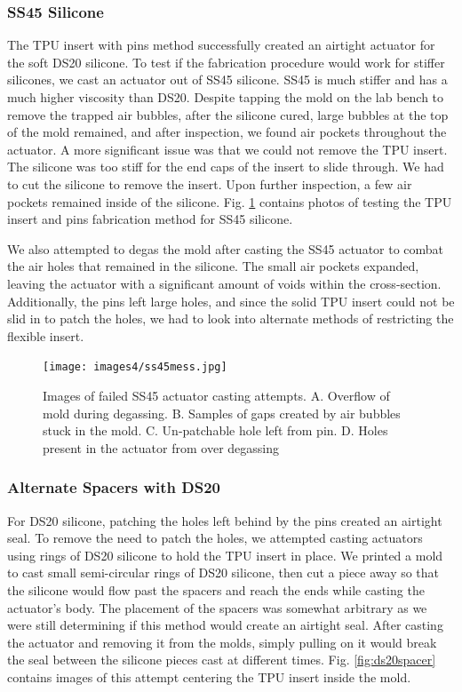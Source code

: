 \subsubsection{SS45 Silicone}

The TPU insert with pins method successfully created an airtight actuator for the soft DS20 silicone. To test if the fabrication procedure would work for stiffer silicones, we cast an actuator out of SS45 silicone. SS45 is much stiffer and has a much higher viscosity than DS20. Despite tapping the mold on the lab bench to remove the trapped air bubbles, after the silicone cured, large bubbles at the top of the mold remained, and after inspection, we found air pockets throughout the actuator. A more significant issue was that we could not remove the TPU insert. The silicone was too stiff for the end caps of the insert to slide through. We had to cut the silicone to remove the insert. Upon further inspection, a few air pockets remained inside of the silicone. Fig. \ref{fig:ss45mess} contains photos of testing the TPU insert and pins fabrication method for SS45 silicone. 

We also attempted to degas the mold after casting the SS45 actuator to combat the air holes that remained in the silicone. The small air pockets expanded, leaving the actuator with a significant amount of voids within the cross-section. Additionally, the pins left large holes, and since the solid TPU insert could not be slid in to patch the holes, we had to look into alternate methods of restricting the flexible insert. 

\begin{figure}[!ht]
    \centering
    \texttt{[image: images4/ss45mess.jpg]}
    \caption{Images of failed SS45 actuator casting attempts. A. Overflow of mold during degassing. B. Samples of gaps created by air bubbles stuck in the mold. C. Un-patchable hole left from pin. D. Holes present in the actuator from over degassing}
    \label{fig:ss45mess}
\end{figure}

\subsubsection{Alternate Spacers with DS20}

For DS20 silicone, patching the holes left behind by the pins created an airtight seal. To remove the need to patch the holes, we attempted casting actuators using rings of DS20 silicone to hold the TPU insert in place. We printed a mold to cast small semi-circular rings of DS20 silicone, then cut a piece away so that the silicone would flow past the spacers and reach the ends while casting the actuator's body. The placement of the spacers was somewhat arbitrary as we were still determining if this method would create an airtight seal. After casting the actuator and removing it from the molds, simply pulling on it would break the seal between the silicone pieces cast at different times. Fig. \ref{fig:ds20spacer} contains images of this attempt centering the TPU insert inside the mold. 

